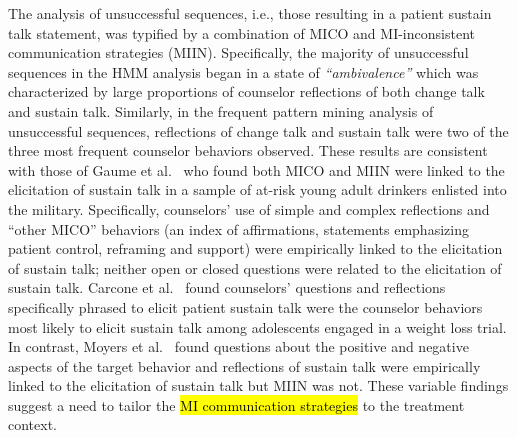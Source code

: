 \documentclass[smallextended]{svjour3}       %
\begin{document}
The analysis of unsuccessful sequences, i.e., those resulting in a patient sustain talk statement, was typified by a combination of MICO and MI-inconsistent communication strategies (MIIN). Specifically, the majority of unsuccessful sequences in the HMM analysis began in a state of \textit{``ambivalence''} which was characterized by large proportions of counselor reflections of both change talk and sustain talk. Similarly, in the frequent pattern mining analysis of unsuccessful sequences, reflections of change talk and sustain talk were two of the three most frequent counselor behaviors observed. These results are consistent with those of Gaume et al.~\cite{gaume2010counselor} who found both MICO and MIIN were linked to the elicitation of sustain talk in a sample of at-risk young adult drinkers enlisted into the military. Specifically, counselors' use of simple and complex reflections and ``other MICO'' behaviors (an index of affirmations, statements emphasizing patient control, reframing and support) were empirically linked to the elicitation of sustain talk; neither open or closed questions were related to the elicitation of sustain talk. Carcone et al.~\cite{carcone2013provider} found counselors' questions and reflections specifically phrased to elicit patient sustain talk were the counselor behaviors most likely to elicit sustain talk among adolescents engaged in a weight loss trial. In contrast, Moyers et al.~\cite{moyers2009session} found questions about the positive and negative aspects of the target behavior and reflections of sustain talk were empirically linked to the elicitation of sustain talk but MIIN was not. These variable findings suggest a need to tailor the \hl{MI communication strategies} to the treatment context. 
\end{document}
